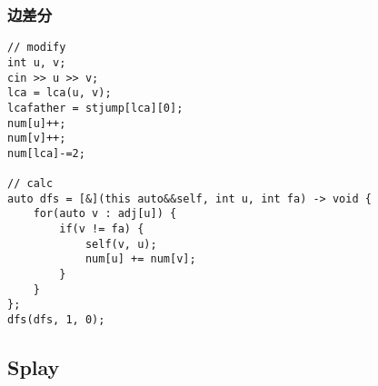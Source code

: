 \subsubsection{边差分}

\begin{lstlisting}
// modify
int u, v;
cin >> u >> v;
lca = lca(u, v);
lcafather = stjump[lca][0];
num[u]++;
num[v]++;
num[lca]-=2;

// calc
auto dfs = [&](this auto&&self, int u, int fa) -> void {
    for(auto v : adj[u]) {
        if(v != fa) {
            self(v, u);
            num[u] += num[v];
        }
    }
};
dfs(dfs, 1, 0);
\end{lstlisting}


\subsection{Splay}
